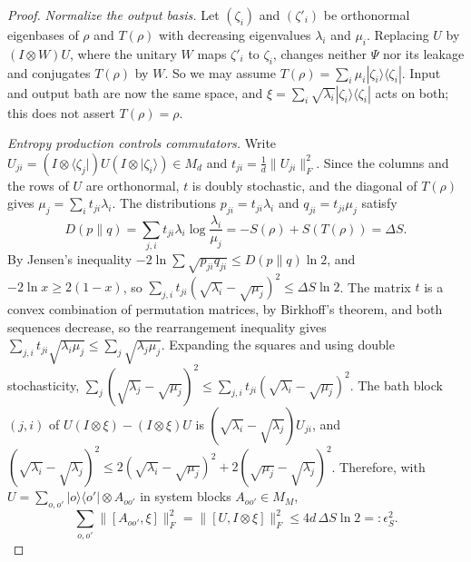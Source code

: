 \begin{proof}
\emph{Normalize the output basis.} Let $(\zeta_i)$ and $(\zeta'_i)$ be orthonormal eigenbases of $\rho$ and $T(\rho)$ with decreasing eigenvalues
$\lambda_i$ and $\mu_i$. Replacing $U$ by $(I\otimes W)U$, where the unitary $W$ maps $\zeta'_i$ to $\zeta_i$, changes neither $\Psi$ nor its
leakage and conjugates $T(\rho)$ by $W$. So we may assume $T(\rho)=\sum_i\mu_i|\zeta_i\rangle\langle\zeta_i|$. Input and output bath are now the
same space, and $\xi=\sum_i\sqrt{\lambda_i}|\zeta_i\rangle\langle\zeta_i|$ acts on both; this does not assert $T(\rho)=\rho$.

\emph{Entropy production controls commutators.} Write $U_{ji}=(I\otimes\langle\zeta_j|)U(I\otimes|\zeta_i\rangle)\in M_d$ and $t_{ji}=\frac1d\|U_{ji}\|_F^2$.
Since the columns and the rows of $U$ are orthonormal, $t$ is doubly stochastic, and the diagonal of $T(\rho)$ gives $\mu_j=\sum_it_{ji}\lambda_i$. The
distributions $p_{ji}=t_{ji}\lambda_i$ and $q_{ji}=t_{ji}\mu_j$ satisfy
\[
D(p\|q)=\sum_{j,i}t_{ji}\lambda_i\log\frac{\lambda_i}{\mu_j}=-S(\rho)+S(T(\rho))=\Delta S .
\]
By Jensen's inequality $-2\ln\sum\sqrt{p_{ji}q_{ji}}\le D(p\|q)\ln2$, and $-2\ln x\ge2(1-x)$, so
$\sum_{j,i}t_{ji}(\sqrt{\lambda_i}-\sqrt{\mu_j})^2\le\Delta S\ln2$. The matrix $t$ is a convex combination of permutation matrices, by Birkhoff's
theorem, and both sequences decrease, so the rearrangement inequality gives
$\sum_{j,i}t_{ji}\sqrt{\lambda_i\mu_j}\le\sum_j\sqrt{\lambda_j\mu_j}$. Expanding the squares and using double stochasticity,
$\sum_j(\sqrt{\lambda_j}-\sqrt{\mu_j})^2\le\sum_{j,i}t_{ji}(\sqrt{\lambda_i}-\sqrt{\mu_j})^2$. The bath block $(j,i)$ of $U(I\otimes\xi)-(I\otimes\xi)U$
is $(\sqrt{\lambda_i}-\sqrt{\lambda_j})U_{ji}$, and $(\sqrt{\lambda_i}-\sqrt{\lambda_j})^2\le2(\sqrt{\lambda_i}-\sqrt{\mu_j})^2+2(\sqrt{\mu_j}-\sqrt{\lambda_j})^2$.
Therefore, with $U=\sum_{o,o'}|o\rangle\langle o'|\otimes A_{oo'}$ in system blocks $A_{oo'}\in M_M$,
\begin{equation}\label{eq:block-commutators}
\sum_{o,o'}\|[A_{oo'},\xi]\|_F^2=\|[U,I\otimes\xi]\|_F^2\le4d\,\Delta S\ln2=:\epsilon_S^2 .
\end{equation}


\end{proof}
